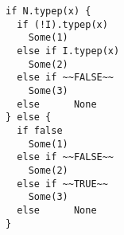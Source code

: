\begin{lstlisting}[style=reclojureScala]
if N.typep(x) {
  if (!I).typep(x)
    Some(1)
  else if I.typep(x)
    Some(2)
  else if ~~FALSE~~
    Some(3)
  else      None
} else {
  if false
    Some(1)
  else if ~~FALSE~~
    Some(2)
  else if ~~TRUE~~
    Some(3)
  else      None
}
\end{lstlisting}
